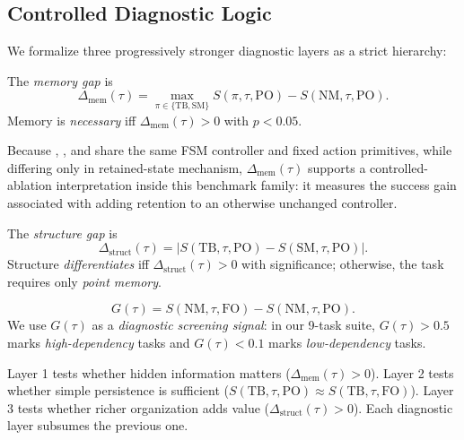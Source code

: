 \subsection{Controlled Diagnostic Logic}

We formalize three progressively stronger diagnostic layers as a strict hierarchy:

\begin{definition}
The \emph{memory gap} is
\[
\Delta_{\text{mem}}(\tau) = \max_{\pi \in \{\text{TB}, \text{SM}\}} S(\pi, \tau, \text{PO}) - S(\text{NM}, \tau, \text{PO}).
\]
Memory is \emph{necessary} iff $\Delta_{\text{mem}}(\tau) > 0$ with $p < 0.05$.
\end{definition}

Because , , and  share the same FSM controller and fixed action primitives, while differing only in retained-state mechanism, $\Delta_{\text{mem}}(\tau)$ supports a controlled-ablation interpretation inside this benchmark family: it measures the success gain associated with adding retention to an otherwise unchanged controller.

\begin{definition}
The \emph{structure gap} is
\[
\Delta_{\text{struct}}(\tau) = |S(\text{TB}, \tau, \text{PO}) - S(\text{SM}, \tau, \text{PO})|.
\]
Structure \emph{differentiates} iff $\Delta_{\text{struct}}(\tau) > 0$ with significance; otherwise, the task requires only \emph{point memory}.
\end{definition}

\begin{definition}
\[
G(\tau) = S(\text{NM}, \tau, \text{FO}) - S(\text{NM}, \tau, \text{PO}).
\]
We use $G(\tau)$ as a \emph{diagnostic screening signal}: in our 9-task suite, $G(\tau) > 0.5$ marks \emph{high-dependency} tasks and $G(\tau) < 0.1$ marks \emph{low-dependency} tasks.
\end{definition}

\begin{proposition}
Layer 1 tests whether hidden information matters ($\Delta_{\text{mem}}(\tau) > 0$). Layer 2 tests whether simple persistence is sufficient ($S(\text{TB}, \tau, \text{PO}) \approx S(\text{TB}, \tau, \text{FO})$). Layer 3 tests whether richer organization adds value ($\Delta_{\text{struct}}(\tau) > 0$). Each diagnostic layer subsumes the previous one.
\end{proposition}


